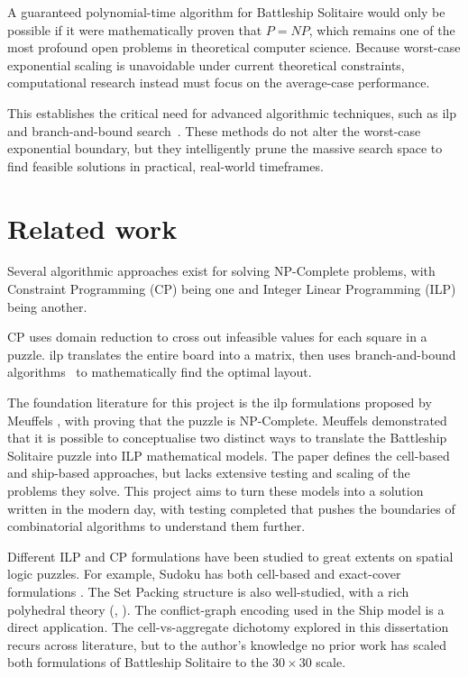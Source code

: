 A guaranteed polynomial-time algorithm for Battleship Solitaire would only be possible if it were mathematically proven that $P = NP$, which remains one of the most profound open problems in theoretical computer science. Because worst-case exponential scaling is unavoidable under current theoretical constraints, computational research instead must focus on the average-case performance.

This establishes the critical need for advanced algorithmic techniques, such as \gls{ilp} and branch-and-bound search~\citep{wolsey1998integer}. These methods do not alter the worst-case exponential boundary, but they intelligently prune the massive search space to find feasible solutions in practical, real-world timeframes.

\section{Related work}\label{sec:related}

Several algorithmic approaches exist for solving NP-Complete problems, with Constraint Programming (CP) being one and Integer Linear Programming (ILP) being another. 

CP uses domain reduction to cross out infeasible values for each square in a puzzle. \gls{ilp} translates the entire board into a matrix, then uses branch-and-bound algorithms~\citep{wolsey1998integer} to mathematically find the optimal layout.

The foundation literature for this project is the \gls{ilp} formulations proposed by Meuffels \citep{meuffels-battleship}, with \citet{sevenster2004battleships} proving that the puzzle is NP-Complete. Meuffels demonstrated that it is possible to conceptualise two distinct ways to translate the Battleship Solitaire puzzle into ILP mathematical models. The paper defines the cell-based and ship-based approaches, but lacks extensive testing and scaling of the problems they solve. This project aims to turn these models into a solution written in the modern day, with testing completed that pushes the boundaries of combinatorial algorithms to understand them further.

Different ILP and CP formulations have been studied to great extents on spatial logic puzzles. For example, Sudoku has both cell-based and exact-cover formulations \citep{sudoku-ilp}. The Set Packing structure is also well-studied, with a rich polyhedral theory (\citet{padberg1973facial}, \citet{wolsey1998integer}). The conflict-graph encoding used in the Ship model is a direct application. The cell-vs-aggregate dichotomy explored in this dissertation recurs across literature, but to the author's knowledge no prior work has scaled both formulations of Battleship Solitaire to the $30 \times 30$ scale.


